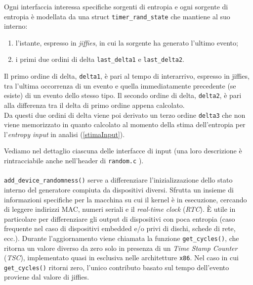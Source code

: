 \documentclass{article}
\begin{document}
 Ogni interfaccia interessa specifiche sorgenti di entropia e ogni sorgente di
 entropia è modellata da una struct \verb+timer_rand_state+ che mantiene al suo interno:
 \begin{enumerate}
   \item l'istante, espresso in \emph{jiffies}, in cui la
   sorgente ha generato l'ultimo evento;
   \item i primi due ordini di delta \verb+last_delta1+ e \verb+last_delta2+.
 \end{enumerate} 
 
 Il primo ordine di delta, \verb+delta1+, è pari al tempo di interarrivo,
 espresso in jiffies, tra l'ultima occorrenza di un evento e quella
 immediatamente precedente (se esiste) di un evento dello stesso tipo.\newline{}
 Il secondo ordine di delta, \verb+delta2+, è pari alla differenza tra il delta
 di primo ordine appena calcolato.\\
 Da questi due ordini di delta viene poi derivato un terzo ordine \verb+delta3+
 che non viene memorizzato in quanto calcolato al momento della stima
 dell'entropia per l'\emph{entropy input} in analisi (\ref{stimaInput}).
 
 Vediamo nel dettaglio ciascuna delle interfacce di input (una loro descrizione
 è rintracciabile anche nell'header di \verb+random.c+ \cite{mack}).\\
 
 
 \paragraph{}\verb+add_device_randomness()+ serve a differenziare 
 l'inizializzazione dello stato interno del generatore compiuta da dispositivi
 diversi. Sfrutta un insieme di informazioni specifiche per la macchina su cui
 il kernel è in esecuzione, cercando di leggere indirizzi MAC, numeri seriali e
 il \emph{real-time clock} (\emph{RTC}). 
 È utile in particolare per differenziare gli output di dispositivi con poca
 entropia (caso frequente nel caso di dispositivi embedded e/o privi di dischi, 
 schede di rete, ecc.). \newline
 Durante l'aggiornamento viene chiamata la funzione \verb+get_cycles()+, che
 ritorna un valore diverso da zero solo in presenza di un \emph{Time Stamp
 Counter} (\emph{TSC}), implementato quasi in esclusiva nelle architetture
 \verb+x86+. Nel caso in cui \verb+get_cycles()+ ritorni zero, l'unico
 contributo basato sul tempo dell'evento proviene dal valore di jiffies.
 
\end{document}
